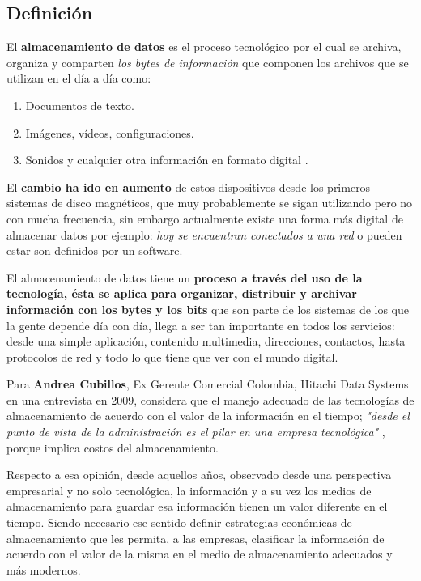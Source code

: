 \documentclass[10pt,journal]{IEEEtran}
\begin{document}
    \subsection{\textbf{Definición}}
    El \textbf{almacenamiento de datos} es el proceso tecnológico por el cual se archiva, organiza y comparten \textit{los bytes de información} que componen los archivos que se utilizan en el día a día como: 
    \begin{enumerate}
        \item Documentos de texto.
        \item Imágenes, vídeos, configuraciones.
        \item Sonidos y cualquier otra información en formato digital \citep{guevara2016implementacion}.
    \end{enumerate}
    
    
    El \textbf{cambio ha ido en aumento} de estos dispositivos desde los primeros sistemas de disco magnéticos, que muy probablemente se sigan utilizando pero no con mucha frecuencia, sin embargo actualmente existe una forma más digital de almacenar datos por ejemplo: \textit{hoy se encuentran conectados a una red} o pueden estar son definidos por un software.
    
    El almacenamiento de datos tiene un \textbf{proceso a través del uso de la tecnología, ésta se aplica para organizar, distribuir y archivar información con los bytes y los bits} que son parte de los sistemas de los que la gente depende día con día, llega a ser tan importante en todos los servicios: desde una simple aplicación, contenido multimedia, direcciones, contactos, hasta protocolos de red y todo lo que tiene que ver con el mundo digital.

    Para \textbf{Andrea Cubillos}, Ex Gerente Comercial Colombia, Hitachi Data Systems en una entrevista en 2009, considera que el manejo adecuado de las tecnologías de almacenamiento de acuerdo con el valor de la información en el tiempo; \textit{"desde el punto de vista de la administración es el pilar en una empresa tecnológica"} \citep{RevistaS75:online}, porque implica costos del almacenamiento.
    
    Respecto a esa opinión, desde aquellos años, observado desde una perspectiva empresarial y no solo tecnológica, la información y a su vez los medios de almacenamiento para guardar esa información tienen un valor diferente en el tiempo. Siendo necesario ese sentido definir estrategias económicas de almacenamiento que les permita, a las empresas, clasificar la información de acuerdo con el valor de la misma en el medio de almacenamiento adecuados y más modernos.
    
\end{document}
